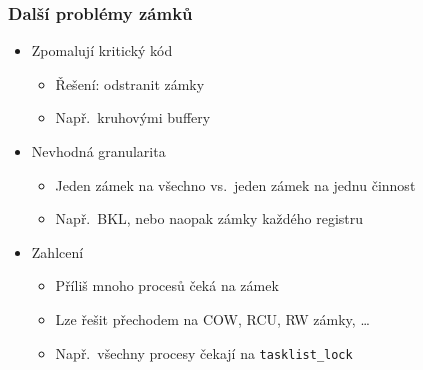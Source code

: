 \begin{frame}
  \frametitle{Další problémy zámků}

  \begin{itemize}
  \item Zpomalují kritický kód
  \begin{itemize}
  \item Řešení: odstranit zámky
  \item Např.\ kruhovými buffery
  \end{itemize}

  \pause

  \item Nevhodná granularita
  \begin{itemize}
  \item Jeden zámek na všechno vs.\ jeden zámek na jednu činnost
  \item Např.\ BKL, nebo naopak zámky každého registru
  \end{itemize}

  \pause

  \item Zahlcení
  \begin{itemize}
  \item Příliš mnoho procesů čeká na zámek
  \item Lze řešit přechodem na COW, RCU, RW zámky, \ldots
  \item Např.\ všechny procesy čekají na \texttt{tasklist\_lock}
  \end{itemize}
  \end{itemize}

\end{frame}

